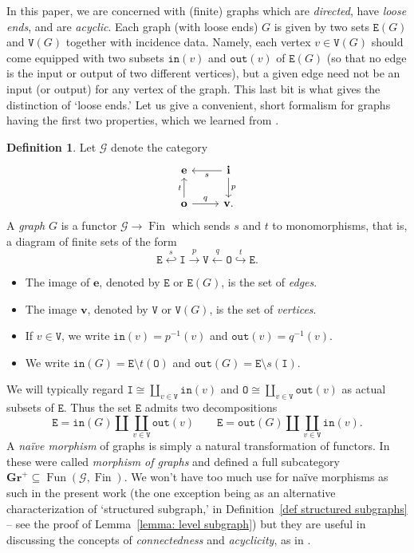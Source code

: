 \documentclass{amsart}
\numberwithin{theorem}{subsection}
\theoremstyle{definition}
\newtheorem{definition}[theorem]{Definition}
\newcommand{\xFun}{\operatorname{Fun}}
\newcommand{\finset}{\operatorname{Fin}}
\newcommand{\out}{\mathtt{out}}
\newcommand{\inp}{\mathtt{in}}
\newcommand{\edge}{\mathtt{E}}
\newcommand{\vertex}{\mathtt{V}}
\begin{document}
In this paper, we are concerned with (finite) graphs which are \emph{directed}, have \emph{loose ends}, and are \emph{acyclic}.
Each graph (with loose ends) $G$ is given by two sets $\edge(G)$ and $\vertex(G)$ together with incidence data.
Namely, each vertex $v\in \vertex(G)$ should come equipped with two subsets $\inp(v)$ and $\out(v)$ of $\edge(G)$ (so that no edge is the input or output of two different vertices), but a given edge need not be an input (or output) for any vertex of the graph.
This last bit is what gives the distinction of `loose ends.'
Let us give a convenient, short formalism for graphs having the first two properties, which we learned from \cite[1.1.1]{Kock_Properads}.
\begin{definition}\label{graph definition}
Let $\mathscr{G}$ denote the category
\[
\begin{tikzcd}
\mathbf{e} & \mathbf{i} \dar{p} \lar{s} \\
\mathbf{o} \uar{t} \rar{q} & \mathbf{v}.
\end{tikzcd}
\]
A \emph{graph} $G$ is a functor $\mathscr{G} \to \finset$ which sends $s$ and $t$ to monomorphisms, that is, a diagram of finite sets of the form
\[
	\edge \overset{s}\hookleftarrow \mathtt{I} \overset{p}\rightarrow \vertex \overset{q}\leftarrow \mathtt{O} \overset{t}\hookrightarrow \edge.
\]
\begin{itemize}
	\item The image of $\mathbf{e}$, denoted by $\edge$ or $\edge(G)$, is the set of \emph{edges}.
	\item The image $\mathbf{v}$, denoted by $\vertex$ or $\vertex(G)$, is the set of \emph{vertices}.
	\item If $v\in \vertex$, we write $\inp(v) = p^{-1}(v)$ and $\out(v) = q^{-1}(v)$.
	\item We write $\inp(G) = \edge \setminus t(\mathtt{O})$ and $\out(G) = \edge \setminus s(\mathtt{I})$.
\end{itemize}
\end{definition}

We will typically regard $\mathtt{I}\cong \coprod_{v\in \vertex} \inp(v)$ and $\mathtt{O} \cong \coprod_{v\in \vertex} \out(v)$ as actual subsets of $\edge$.
Thus the set $\edge$ admits two decompositions
\[
	\edge = \inp(G) \amalg \coprod_{v\in \vertex} \out(v) \qquad \edge = \out(G) \amalg \coprod_{v\in \vertex} \inp(v).
\]
A \emph{na\"ive morphism} of graphs is simply a natural transformation of functors.
In \cite[1.1.7]{Kock_Properads} these were called \emph{morphism of graphs} and defined a full subcategory $\mathbf{Gr}^+ \subseteq \xFun(\mathscr{G}, \finset)$.
We won't have too much use for na\"ive morphisms as such in the present work (the one exception being as an alternative characterization of `structured subgraph,' in Definition~\ref{def structured subgraphs} -- see the proof of Lemma~\ref{lemma: level subgraph}) but they are useful in discussing the concepts of \emph{connectedness} and \emph{acyclicity}, as in \cite[\S 1.2]{Kock_Properads}.
\end{document}
